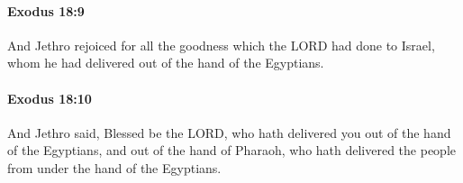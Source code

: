 		\paragraph{Exodus 18:9} %
			\label{EXODUS-18-9}

			And Jethro rejoiced for all the goodness which the LORD had done to Israel, whom he had delivered out of the hand of the Egyptians.


		\paragraph{Exodus 18:10} %
			\label{EXODUS-18-10}

			And Jethro said, Blessed be the LORD, who hath delivered you out of the hand of the Egyptians, and out of the hand of Pharaoh, who hath delivered the people from under the hand of the Egyptians.


